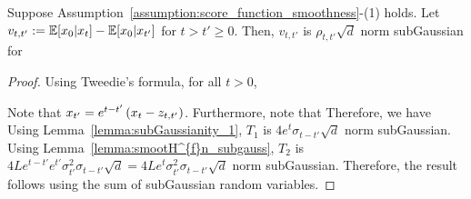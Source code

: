 \begin{lemma}\label{lemma:subGaussianity_2}
Suppose Assumption~\ref{assumption:score_function_smoothness}-(1) holds. Let $v_{t,t'} := \mathbb{E}[x_0|x_{t}]-\mathbb{E}[x_0|x_{t'}]$ for $t > t' \geq 0$. Then, $v_{t,t'}$ is $\rho_{t,t'}\sqrt{d}$ norm subGaussian for 
\end{lemma}
\begin{proof}
    Using Tweedie's formula, for all $t > 0$,
    
    Note that $x_{t'} = e^{t-t'}\left(x_t - z_{t,t'}\right)$. Furthermore, note that
    Therefore, we have 
    Using Lemma~\ref{lemma:subGaussianity_1}, $T_1$ is $4e^{t}\sigma_{t-t'}\sqrt{d}$ norm subGaussian. Using Lemma~\ref{lemma:smootH^{f}n_subgauss}, $T_2$ is $4L e^{t-t'}e^{t'}\sigma_{t'}^{2}\sigma_{t-t'}\sqrt{d} = 4Le^{t}\sigma_{t'}^{2}\sigma_{t-t'}\sqrt{d}$ norm subGaussian. Therefore, the result follows using the sum of subGaussian random variables.
\end{proof}

